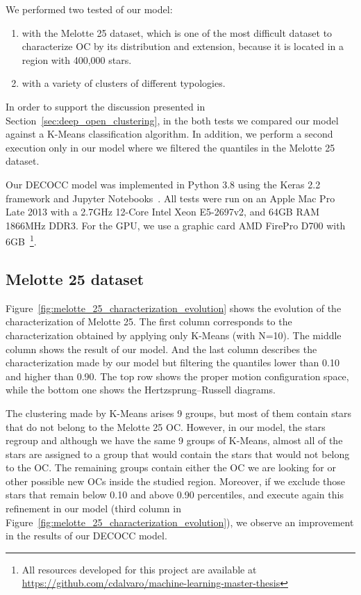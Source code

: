 \documentclass[11pt,a4paper,english,twocolumn]{article}
\begin{document}
We performed two tested of our model:

\begin{enumerate}
  \item with the Melotte 25 dataset, which is one of the most difficult dataset to characterize OC
        by its distribution and extension, because it is located in a region with 400,000 stars.
  \item with a variety of clusters of different typologies.
\end{enumerate}

In order to support the discussion presented in Section~\ref{sec:deep_open_clustering}, in the both
tests we compared our model against a K-Means classification algorithm. In addition, we perform a
second execution only in our model where we filtered the quantiles in the Melotte 25 dataset.

Our DECOCC model was implemented in Python 3.8 using the Keras 2.2 framework and Jupyter
Notebooks~\cite{Kluyver2016jupyter}. All tests were run on an Apple Mac Pro Late 2013 with a
2.7GHz 12-Core Intel Xeon E5-2697v2, and 64GB RAM 1866MHz DDR3. For the GPU, we use a graphic
card AMD FirePro D700 with 6GB~\footnote{All resources developed for this project are available
at \href{https://github.com/cdalvaro/machine-learning-master-thesis}
{https://github.com/cdalvaro/machine-learning-master-thesis}}.

\subsection{Melotte 25 dataset}

Figure~\ref{fig:melotte_25_characterization_evolution} shows the evolution of the characterization
of Melotte 25. The first column corresponds to the characterization obtained by applying only
K-Means (with N=10). The middle column shows the result of our model. And the last column describes
the characterization made by our model but filtering the quantiles lower than 0.10 and higher than
0.90. The top row shows the proper motion configuration space, while the bottom one shows the
Hertzsprung–Russell diagrams.


The clustering made by K-Means arises 9 groups, but most of them contain stars that do not belong
to the Melotte 25 OC. However, in our model, the stars regroup and although we have the same 9
groups of K-Means, almost all of the stars are assigned to a group that would contain the stars
that would not belong to the OC. The remaining groups contain either the OC we are looking for or
other possible new OCs inside the studied region. Moreover, if we exclude those stars that remain
below 0.10 and above 0.90 percentiles, and execute again this refinement in our model (third column
in Figure~\ref{fig:melotte_25_characterization_evolution}), we observe an improvement in the
results of our DECOCC model.
\end{document}
